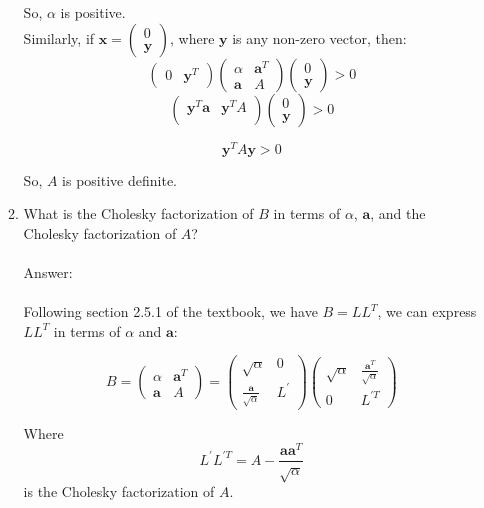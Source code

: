 \documentclass{article}
\renewcommand{\vec}[1]{\mathbf{#1}}
\begin{document}
\begin{enumerate}
\begin{enumerate}
So, $\alpha$ is positive.\\
Similarly, if $\vec{x}=\begin{pmatrix} 0 \\ \vec{y} \end{pmatrix}$, where $\vec{y}$ is any non-zero vector, then:
$$\begin{pmatrix} 0 & \vec{y}^T \end{pmatrix}
\begin{pmatrix}
\alpha & \vec{a}^T \\
\vec{a} & A
\end{pmatrix}\begin{pmatrix} 0 \\ \vec{y} \end{pmatrix}>0
$$
$$\begin{pmatrix}
\vec{y}^T\vec{a} & \vec{y}^TA \\
\end{pmatrix}\begin{pmatrix} 0 \\ \vec{y} \end{pmatrix}>0
$$

$$ \vec{y}^TA\vec{y} > 0 $$

So, $A$ is positive definite.

\item What is the Cholesky factorization of $B$ in terms of $\alpha$, $\vec{a}$, and the Cholesky factorization of $A$?\\
\\
Answer:\\
\\
Following section 2.5.1 of the textbook, we have $B=LL^T$, we can express $LL^T$ in terms of $\alpha$ and $\vec{a}$:

$$
B = \begin{pmatrix}
\alpha & \vec{a}^T \\
\vec{a} & A
\end{pmatrix} =
\begin{pmatrix}
\sqrt{\alpha} & 0 \\
\frac{\vec{a}}{\sqrt{\alpha}} & L^\prime
\end{pmatrix}
\begin{pmatrix}
\sqrt{\alpha} & \frac{\vec{a}^T}{\sqrt{\alpha}} \\
0 & L^{\prime T}
\end{pmatrix}
$$

Where $$L^\prime L^{\prime T}=A-\frac{\vec{a}\vec{a}^T}{\sqrt{\alpha}}$$ is the Cholesky factorization of $A$.
\end{enumerate}
\end{enumerate}
\end{document}
